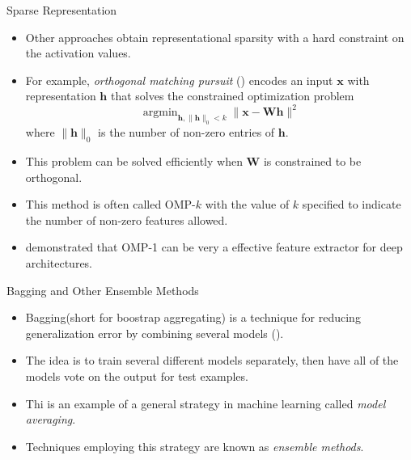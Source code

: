 \documentclass[10pt]{beamer}
\begin{document}
	\begin{frame}{Sparse Representation}
		\begin{itemize}
			\item Other approaches obtain representational sparsity with a hard constraint on the activation values.
			\pause
			\item For example, \emph{orthogonal matching pursuit} (\citet{pati1993orthogonal}) encodes an input $\bm{x}$ with representation $\bm{h}$ that solves the constrained optimization problem
			$$\mathop{\arg\min}_{\bm{h},\lVert\bm{h}\rVert_0<k}\lVert\bm{x}-\bm{Wh}\rVert^2$$
			where $\lVert\bm{h}\rVert_0$ is the number of non-zero entries of $\bm{h}$. 
			
			\pause
			\item This problem can be solved efficiently when $\bm{W}$ is constrained to be orthogonal.
			\pause
			\item This method is often called OMP-$k$ with the value of $k$ specified to indicate the number of non-zero features allowed.
			\pause
			\item \citet{coates2010analysis} demonstrated that OMP-1 can be very a effective feature extractor for deep architectures.
		\end{itemize}
	\end{frame}
	
	\begin{frame}{Bagging and Other Ensemble Methods}
		\begin{itemize}
			\pause
			\item Bagging(short for boostrap aggregating) is a technique for reducing generalization error by combining several models (\citet{breiman1996bagging}).
			\pause
			\item The idea is to train several different models separately, then have all of the models vote on the output for test examples.
			\pause
			\item Thi is an example of a general strategy in machine learning called \emph{model averaging}.
			\pause
			\item Techniques employing this strategy are known as \emph{ensemble methods}.
		\end{itemize}
	\end{frame}
	
\end{document}
